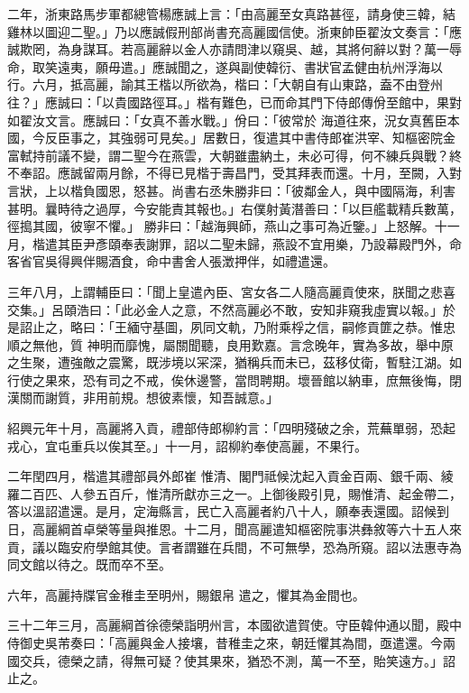 \begin{pinyinscope}
 二年，浙東路馬步軍都總管楊應誠上言：「由高麗至女真路甚徑，請身使三韓，結
 雞林以圖迎二聖。」乃以應誠假刑部尚書充高麗國信使。浙東帥臣翟汝文奏言：「應誠欺罔，為身謀耳。若高麗辭以金人亦請問津以窺吳、越，其將何辭以對？萬一辱命，取笑遠夷，願毋遣。」應誠聞之，遂與副使韓衍、書狀官孟健由杭州浮海以行。六月，抵高麗，諭其王楷以所欲為，楷曰：「大朝自有山東路，盍不由登州往？」應誠曰：「以貴國路徑耳。」楷有難色，已而命其門下侍郎傳佾至館中，果對如翟汝文言。應誠曰：「女真不善水戰。」佾曰：「彼常於
 海道往來，況女真舊臣本國，今反臣事之，其強弱可見矣。」居數日，復遣其中書侍郎崔洪宰、知樞密院金富軾持前議不變，謂二聖今在燕雲，大朝雖盡納土，未必可得，何不練兵與戰？終不奉詔。應誠留兩月餘，不得已見楷于壽昌門，受其拜表而還。十月，至闕，入對言狀，上以楷負國恩，怒甚。尚書右丞朱勝非曰：「彼鄰金人，與中國隔海，利害甚明。曩時待之過厚，今安能責其報也。」右僕射黃潛善曰：「以巨艦載精兵數萬，徑搗其國，彼寧不懼。」
 勝非曰：「越海興師，燕山之事可為近鑒。」上怒解。十一月，楷遣其臣尹彥頤奉表謝罪，詔以二聖未歸，燕設不宜用樂，乃設幕殿門外，命客省官吳得興伴賜酒食，命中書舍人張澂押伴，如禮遣還。



 三年八月，上謂輔臣曰：「聞上皇遣內臣、宮女各二人隨高麗貢使來，朕聞之悲喜交集。」呂頤浩曰：「此必金人之意，不然高麗必不敢，安知非窺我虛實以報。」於是詔止之，略曰：「王緬守基圖，夙同文軌，乃附乘桴之信，嗣修貢篚之恭。惟忠順之無他，質
 神明而靡愧，屬關聞聽，良用歎嘉。言念晚年，實為多故，舉中原之生聚，遭強敵之震驚，既涉境以冞深，猶稱兵而未已，茲移仗衛，暫駐江湖。如行使之果來，恐有司之不戒，俟休邊警，當問聘期。壞晉館以納車，庶無後悔，閉漢關而謝質，非用前規。想彼素懷，知吾誠意。」



 紹興元年十月，高麗將入貢，禮部侍郎柳約言：「四明殘破之余，荒蕪單弱，恐起戎心，宜屯重兵以俟其至。」十一月，詔柳約奉使高麗，不果行。



 二年閏四月，楷遣其禮部員外郎崔
 惟清、閣門祗候沈起入貢金百兩、銀千兩、綾羅二百匹、人參五百斤，惟清所獻亦三之一。上御後殿引見，賜惟清、起金帶二，答以溫詔遣還。是月，定海縣言，民亡入高麗者約八十人，願奉表還國。詔候到日，高麗綱首卓榮等量與推恩。十二月，聞高麗遣知樞密院事洪彝敘等六十五人來貢，議以臨安府學館其使。言者謂雖在兵間，不可無學，恐為所窺。詔以法惠寺為同文館以待之。既而卒不至。



 六年，高麗持牒官金稚圭至明州，賜銀帛
 遣之，懼其為金間也。



 三十二年三月，高麗綱首徐德榮詣明州言，本國欲遣賀使。守臣韓仲通以聞，殿中侍御史吳芾奏曰：「高麗與金人接壤，昔稚圭之來，朝廷懼其為間，亟遣還。今兩國交兵，德榮之請，得無可疑？使其果來，猶恐不測，萬一不至，貽笑遠方。」詔止之。




\end{pinyinscope}
